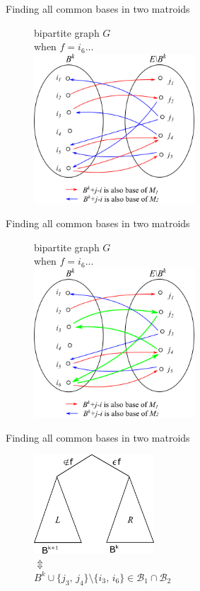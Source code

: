 \documentclass[11pt,xcolor=dvipsnames,table,dvipdfmx]{beamer}
\begin{document}
\begin{frame}{Finding all common bases in two matroids}
 \begin{figure}
  bipartite graph $G$\\
  when $f = i_6$...\vspace{0.52cm}\\
  \centering
  \includegraphics[width=6cm]{text8631-16-2-7.png}
 \end{figure}
\end{frame}

\begin{frame}{Finding all common bases in two matroids}
 \begin{figure}
  bipartite graph $G$\\
  when $f = i_6$...\vspace{0.52cm}\\
  \centering
  \includegraphics[width=6cm]{text8631-16-2-8.png}\\
 \end{figure}
\end{frame}

\begin{frame}{Finding all common bases in two matroids}
 \begin{figure}
  \centering
  \includegraphics[width=4.5cm]{text8631-16-2-9.png}\\
  $\Updownarrow$ \\
  $B^k \cup \{j_3,\,j_4\}\setminus \{i_3,\,i_6\} \in \mathcal{B}_1 \cap \mathcal{B}_2$
 \end{figure}
\end{frame}
\end{document}
